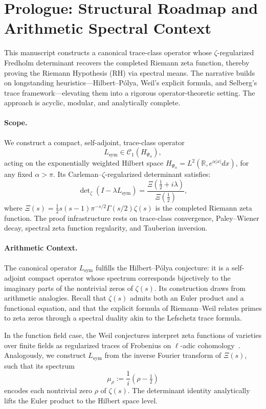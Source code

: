 \section*{Prologue: Structural Roadmap and Arithmetic Spectral Context}
\label{sec:prologue}

\medskip

\noindent
This manuscript constructs a canonical trace-class operator whose \(\zeta\)-regularized Fredholm determinant recovers the completed Riemann zeta function, thereby proving the Riemann Hypothesis (RH) via spectral means. The narrative builds on longstanding heuristics—Hilbert--Pólya, Weil's explicit formula, and Selberg's trace framework—elevating them into a rigorous operator-theoretic setting. The approach is acyclic, modular, and analytically complete.

\paragraph*{Scope.}
We construct a compact, self-adjoint, trace-class operator
\[
L_{\mathrm{sym}} \in \mathcal{C}_1(H_{\Psi_\alpha}),
\]
acting on the exponentially weighted Hilbert space \( H_{\Psi_\alpha} = L^2(\mathbb{R}, e^{\alpha|x|} dx) \), for any fixed \( \alpha > \pi \). Its Carleman–\(\zeta\)-regularized determinant satisfies:
\[
\det\nolimits_{\zeta}(I - \lambda L_{\mathrm{sym}}) = \frac{\Xi(\tfrac{1}{2} + i\lambda)}{\Xi(\tfrac{1}{2})},
\]
where \( \Xi(s) = \tfrac{1}{2}s(s-1)\pi^{-s/2} \Gamma(s/2) \zeta(s) \) is the completed Riemann zeta function. The proof infrastructure rests on trace-class convergence, Paley--Wiener decay, spectral zeta function regularity, and Tauberian inversion.

\paragraph*{Arithmetic Context.}
The canonical operator \( L_{\mathrm{sym}} \) fulfills the Hilbert--Pólya conjecture: it is a self-adjoint compact operator whose spectrum corresponds bijectively to the imaginary parts of the nontrivial zeros of \( \zeta(s) \). Its construction draws from arithmetic analogies. Recall that \( \zeta(s) \) admits both an Euler product and a functional equation, and that the explicit formula of Riemann--Weil relates primes to zeta zeros through a spectral duality akin to the Lefschetz trace formula.

In the function field case, the Weil conjectures interpret zeta functions of varieties over finite fields as regularized traces of Frobenius on \(\ell\)-adic cohomology~\cite{Deligne1971WeilI}. Analogously, we construct \( L_{\mathrm{sym}} \) from the inverse Fourier transform of \( \Xi(s) \), such that its spectrum
\[
\mu_\rho := \frac{1}{i}(\rho - \tfrac{1}{2})
\]
encodes each nontrivial zero \( \rho \) of \( \zeta(s) \). The determinant identity analytically lifts the Euler product to the Hilbert space level.

